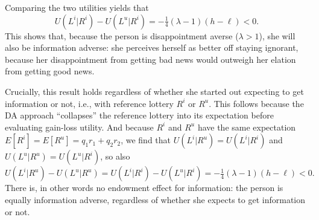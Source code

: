 \documentclass[11pt,reqno]{amsart}
\newcommand{\qrtr}{\tfrac{1}{4}}
\begin{document}
Comparing the two utilities yields that
\begin{equation*}
  U(L^i|R^i) - U(L^u|R^i) = -\qrtr(\lambda-1)(h-\ell) < 0.
\end{equation*}
This shows that, because the person is disappointment averse ($\lambda > 1$),
she will also be information adverse: she perceives herself as better off
staying ignorant, because her disappointment from getting bad news would
outweigh her elation from getting good news. 

Crucially, this result holds regardless of whether she started out expecting
to get information or not, i.e., with reference lottery $R^i$ or $R^u$. This
follows because the DA approach ``collapses'' the reference lottery into its
expectation before evaluating gain-loss utility. And because $R^i$ and $R^u$
have the same expectation $E[R^i] = E[R^u] = q_1r_1 + q_2r_2$, we find that
$U(L^i|R^u) = U(L^i|R^i)$ and $U(L^u|R^u) = U(L^u|R^i)$, so also
\begin{equation*}
  U(L^i|R^u) - U(L^u|R^u) = U(L^i|R^i) - U(L^u|R^i) = -\qrtr(\lambda-1)(h-\ell) < 0.
\end{equation*}
There is, in other words no endowment effect for information: the person is
equally information adverse, regardless of whether she expects to get
information or not. 
\end{document}

